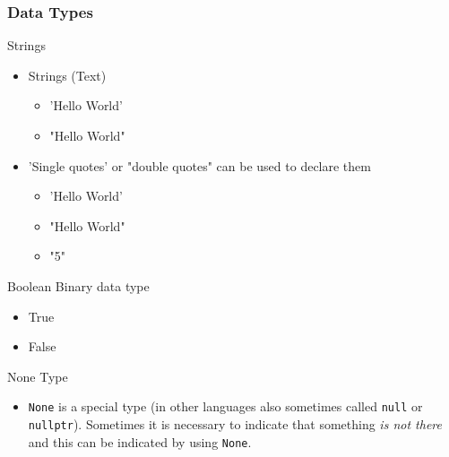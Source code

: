 \documentclass[10pt, a4paper]{beamer} %
\begin{document}
\begin{frame}[c, allowframebreaks]\frametitle{Data Types}
  \begin{block}{Strings}
    \begin{itemize}
      \item Strings (Text)
            \begin{itemize}
              \item {\color{blue}'Hello World'}
              \item {\color{red}"Hello World"}
            \end{itemize}
      \item {\color{blue} 'Single quotes'} or {\color{red} "double quotes"} can be used to declare them
            \begin{itemize}
              \item 'Hello World'
              \item "Hello World"
              \item "5"
            \end{itemize}
    \end{itemize}
  \end{block}
  \begin{block}{Boolean}
    Binary data type
    \begin{itemize}
      \item True
      \item False
    \end{itemize}
  \end{block}
  \begin{block}{None Type}
    \begin{itemize}
      \item \texttt{None} is a special type (in other languages also sometimes called \texttt{null} or \texttt{nullptr}).
    Sometimes it is necessary to indicate that something \textit{is not there} and this can be indicated by using \texttt{None}.
    \end{itemize}
  \end{block}


\end{frame}
\end{document}
